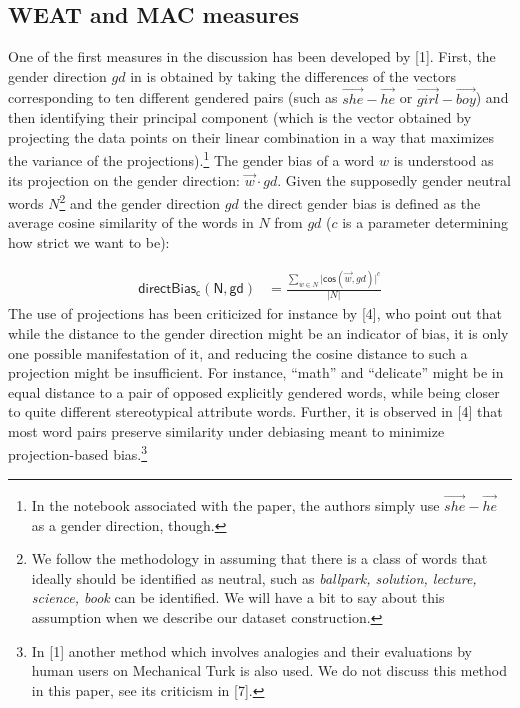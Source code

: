 \documentclass[
  10pt,
  dvipsnames,enabledeprecatedfontcommands, twocolumn]{scrartcl}
\begin{document}
\hypertarget{weat-and-mac-measures}{%
\subsection{WEAT and MAC measures}\label{weat-and-mac-measures}}

One of the first measures in the discussion has been developed by
{[}1{]}. First, the gender direction \(gd\) in is obtained by taking the
differences of the vectors corresponding to ten different gendered pairs
(such as \(\overrightarrow{she} - \overrightarrow{he}\) or
\(\overrightarrow{girl} - \overrightarrow{boy}\)) and then identifying
their principal component (which is the vector obtained by projecting
the data points on their linear combination in a way that maximizes the
variance of the projections).\footnote{In the notebook associated with
  the paper, the authors simply use
  \(\overrightarrow{she} - \overrightarrow{he}\) as a gender direction,
  though.} The gender bias of a word \(w\) is understood as its
projection on the gender direction: \(\vec{w} \cdot gd\). Given the
supposedly gender neutral words \(N\)\footnote{We follow the methodology
  in assuming that there is a class of words that ideally should be
  identified as neutral, such as
  \emph{ballpark, solution, lecture, science, book} can be identified.
  We will have a bit to say about this assumption when we describe our
  dataset construction.}  and the gender
direction \(gd\) the direct gender bias is defined as the average cosine
similarity of the words in \(N\) from \(gd\) (\(c\) is a parameter
determining how strict we want to be):

\footnotesize

\begin{align}
\mathsf{directBias_c(N,gd)} & = \frac{\sum_{w\in N}\vert \mathsf{cos}(\vec{w},gd)\vert^c}{\vert N \vert }
\end{align} \normalsize  The use of projections has been criticized for
instance by {[}4{]}, who point out that while the distance to the gender
direction might be an indicator of bias, it is only one possible
manifestation of it, and reducing the cosine distance to such a
projection might be insufficient. For instance, ``math'' and
``delicate'' might be in equal distance to a pair of opposed explicitly
gendered words, while being closer to quite different stereotypical
attribute words. Further, it is observed in {[}4{]} that most word pairs
preserve similarity under debiasing meant to minimize projection-based
bias.\footnote{In {[}1{]} another method which involves analogies and
  their evaluations by human users on Mechanical Turk is also used. We
  do not discuss this method in this paper, see its criticism in
  {[}7{]}.}
\end{document}
